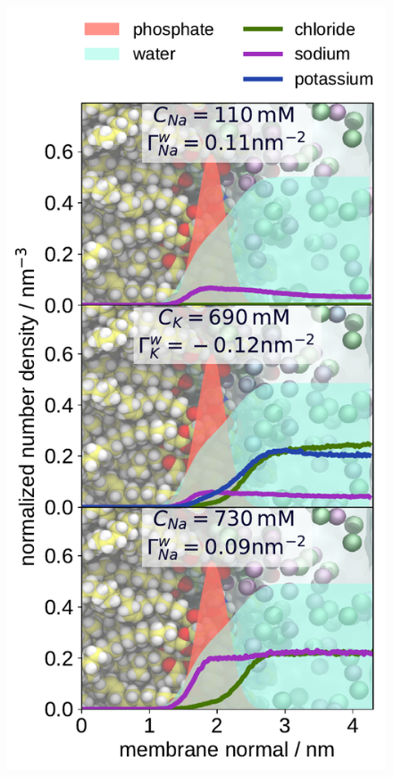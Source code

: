 \documentclass[journal=jpcbfk,manuscript=article]{achemso}
\newlength{\figwidth}
\begin{document}
\begin{figure}[tbp!] 
  \centering 
  \includegraphics[width=\figwidth]{../img/ecc_pops/density_profiles_na_k_cl_wat_phos_models-compar_4-6_NaCl-and-KCl-series.pdf}
  \caption{\label{fig:nacl-dens_PCPS} 
}
\end{figure}
\end{document}
